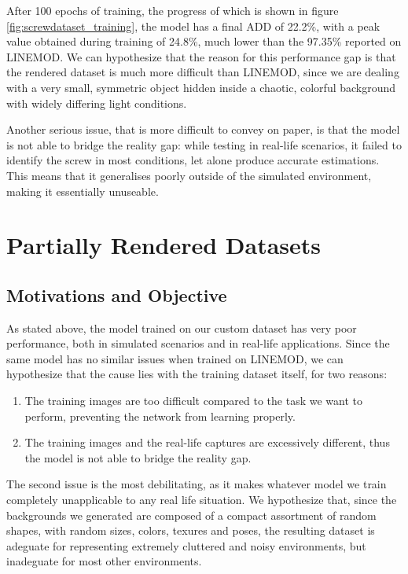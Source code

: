 After 100 epochs of training, the progress of which is shown in figure \ref{fig:screwdataset_training}, the model has a final ADD of 22.2\%, with a peak value obtained during training of 24.8\%, much lower than the 97.35\% reported on LINEMOD. We can hypothesize that the reason for this performance gap is that the rendered dataset is much more difficult than LINEMOD, since we are dealing with a very small, symmetric object hidden inside a chaotic, colorful background with widely differing light conditions.

Another serious issue, that is more difficult to convey on paper, is that the model is not able to bridge the reality gap: while testing in real-life scenarios, it failed to identify the screw in most conditions, let alone produce accurate estimations. This means that it generalises poorly outside of the simulated environment, making it essentially unuseable.

\section{Partially Rendered Datasets}

\subsection{Motivations and Objective}

As stated above, the model trained on our custom dataset has very poor performance, both in simulated scenarios and in real-life applications. Since the same model has no similar issues when trained on LINEMOD, we can hypothesize that the cause lies with the training dataset itself, for two reasons:

\begin{enumerate}
    \item The training images are too difficult compared to the task we want to perform, preventing the network from learning properly.
    \item The training images and the real-life captures are excessively different, thus the model is not able to bridge the reality gap.
\end{enumerate}

The second issue is the most debilitating, as it makes whatever model we train completely unapplicable to any real life situation. We hypothesize that, since the backgrounds we generated are composed of a compact assortment of random shapes, with random sizes, colors, texures and poses, the resulting dataset is adeguate for representing extremely cluttered and noisy environments, but inadeguate for most other environments.


